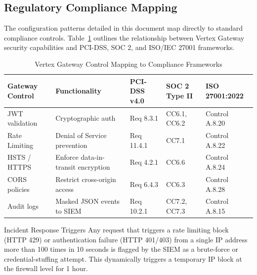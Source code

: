 \subsection{Regulatory Compliance Mapping}
The configuration patterns detailed in this document map directly to standard compliance controls. Table~\ref{tab:compliance_matrix} outlines the relationship between Vertex Gateway security capabilities and PCI-DSS, SOC 2, and ISO/IEC 27001 frameworks.

\begin{table}[htbp]
\centering
\caption{Vertex Gateway Control Mapping to Compliance Frameworks}
\label{tab:compliance_matrix}
\begin{tabularx}{\textwidth}{l X l l l}
\toprule
\textbf{Gateway Control} & \textbf{Functionality} & \textbf{PCI-DSS v4.0} & \textbf{SOC 2 Type II} & \textbf{ISO 27001:2022} \\
\midrule
JWT validation & Cryptographic auth & Req 8.3.1 & CC6.1, CC6.2 & Control A.8.20 \\
Rate Limiting & Denial of Service prevention & Req 11.4.1 & CC7.1 & Control A.8.22 \\
HSTS / HTTPS & Enforce data-in-transit encryption & Req 4.2.1 & CC6.6 & Control A.8.24 \\
CORS policies & Restrict cross-origin access & Req 6.4.3 & CC6.3 & Control A.8.28 \\
Audit logs & Masked JSON events to SIEM & Req 10.2.1 & CC7.2, CC7.3 & Control A.8.15 \\
\bottomrule
\end{tabularx}
\end{table}

\begin{warningbox}{Incident Response Triggers}
Any request that triggers a rate limiting block (HTTP 429) or authentication failure (HTTP 401/403) from a single IP address more than 100 times in 10 seconds is flagged by the SIEM as a brute-force or credential-stuffing attempt. This dynamically triggers a temporary IP block at the firewall level for 1 hour.
\end{warningbox}
